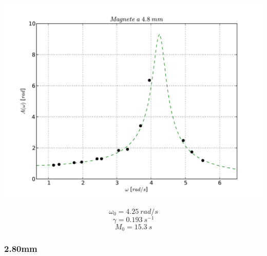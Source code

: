 \begin{center}

\includegraphics[scale=0.5]{"../grafici/Magnetea48mm"}

$$ \omega_0 = 4.25\ rad/s $$
$$ \gamma = 0.193\ s^{-1}$$
$$ M_0 = 15.3\ s$$


\end{center}
 
 
\subsubsection{2.80mm}


